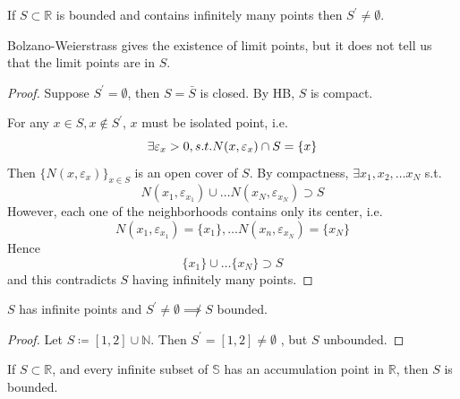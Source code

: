 
\begin{theorem}
    If $S \subset \mathbb{R}$ is bounded and contains infinitely many points then $S^{\prime} \neq \emptyset$.
\end{theorem}

\begin{remark}
    Bolzano-Weierstrass gives the existence of limit points, but it does not tell us 
    that the limit points are in $S$. 
\end{remark}

\begin{proof}
    Suppose $S^{\prime} = \emptyset$, then $S = \bar{S} $ is closed. 
    By HB, $S$ is compact.
    \medskip 

    For any $x \in S, x \notin S^{\prime}$, $x$ must be isolated point, i.e. 
    \[
        \exists \varepsilon_x > 0, s.t. N(x, \varepsilon_x) \cap S = \{ x \} 
    \]
    Then $ \{ N(x, \varepsilon_x) \}_{x \in S} $ is an open cover of $S$. 
    By compactness, $\exists x_1, x_2, \hdots x_N$ s.t. 
    \[
        N(x_1, \varepsilon_{x_1}) \cup \hdots N(x_N, \varepsilon_{x_N}) \supset S
    \]
    However, each one of the neighborhoods contains only its center, i.e. 
    \[
        N(x_1, \varepsilon_{x_1}) = \{ x_1 \}, \hdots N(x_n, \varepsilon_{x_N}) = \{ x_N \} 
    \]
    Hence 
    \[
        \{ x_1 \}  \cup \hdots \{ x_N \}  \supset S
    \]
    and this contradicts $S$ having infinitely many points.
\end{proof}

\begin{remark}
    $S$ has infinite points and $S^{\prime} \neq \emptyset \not \implies S$ bounded. 
\end{remark}

\begin{proof}
    Let $S \coloneq [1, 2] \cup \mathbb{N}$.
    Then $S^{\prime} = [1, 2] \neq \emptyset$  , but $S$ unbounded.
\end{proof}

\begin{remark}
    If $S \subset \mathbb{R}$, and every 
    infinite subset of $\mathbb{S}$ has an accumulation point in $\mathbb{R}$, 
    then $S$ is bounded.
\end{remark}

